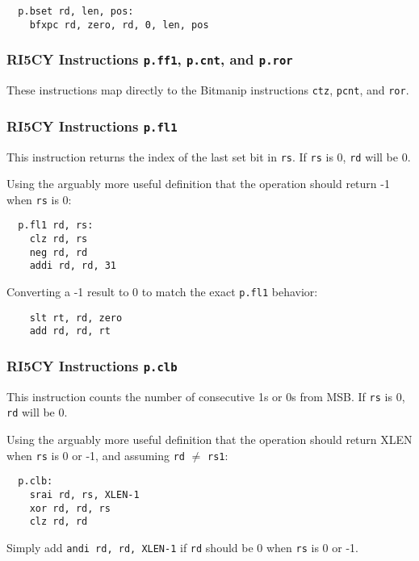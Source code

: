 \begin{verbatim}
  p.bset rd, len, pos:
    bfxpc rd, zero, rd, 0, len, pos
\end{verbatim}

\subsubsection{RI5CY Instructions {\tt p.ff1}, {\tt p.cnt}, and {\tt p.ror}}

These instructions map directly to the Bitmanip instructions {\tt ctz}, {\tt pcnt}, and {\tt ror}.

\subsubsection{RI5CY Instructions {\tt p.fl1}}

This instruction returns the index of the last set bit in {\tt rs}. If {\tt rs} is 0, {\tt rd} will be 0.

Using the arguably more useful definition that the operation should return -1 when {\tt rs} is 0:

\begin{verbatim}
  p.fl1 rd, rs:
    clz rd, rs
    neg rd, rd
    addi rd, rd, 31
\end{verbatim}

Converting a -1 result to 0 to match the exact {\tt p.fl1} behavior:

\begin{verbatim}
    slt rt, rd, zero
    add rd, rd, rt
\end{verbatim}

\subsubsection{RI5CY Instructions {\tt p.clb}}

This instruction counts the number of consecutive 1s or 0s from MSB. If {\tt rs} is 0, {\tt rd} will be 0.

Using the arguably more useful definition that the operation should return XLEN when {\tt rs} is 0 or -1,
and assuming {\tt rd} $\ne$ {\tt rs1}:

\begin{verbatim}
  p.clb:
    srai rd, rs, XLEN-1
    xor rd, rd, rs
    clz rd, rd
\end{verbatim}

Simply add {\tt andi rd, rd, XLEN-1} if {\tt rd} should be 0 when {\tt rs} is 0 or -1.

